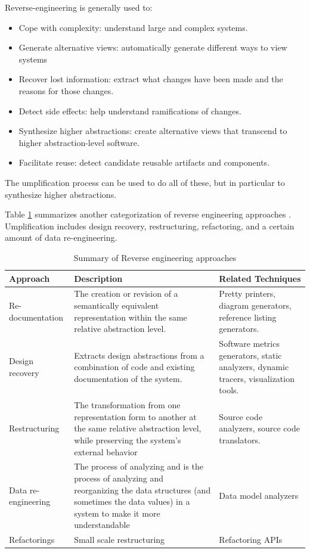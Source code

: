 Reverse-engineering is generally used to:
\begin{itemize}
\item Cope with complexity: understand large and complex systems.
\item Generate alternative views: automatically generate different ways to view systems
\item Recover lost information: extract what changes have been made and the reasons for those changes.
\item Detect side effects: help understand ramifications of changes.
\item Synthesize higher abstractions:  create alternative views that transcend to higher abstraction-level software.
\item Facilitate reuse: detect candidate reusable artifacts and components.
\end{itemize}

The umplification process can be used to do all of these, but in particular to synthesize higher abstractions.

Table \ref{table:approachesRE} summarizes another categorization  of reverse engineering approaches \cite{Chikofsky}. Umplification includes design recovery, restructuring, refactoring, and a certain amount of data re-engineering.

\begin{table}[h]
\centering
\caption{Summary of Reverse engineering approaches \cite{Chikofsky}}
\label{table:approachesRE}
\begin{tabular}{l|p{6cm}|p{4cm}}
\toprule
\rowcolor[HTML]{BBDAFF}
\textbf{Approach} & \textbf{Description}  & \textbf{Related Techniques}  \\ \midrule
Re-documentation 
&  The creation or revision of a semantically equivalent representation within the same relative abstraction level. 
& Pretty printers, diagram generators, reference listing generators.\\ \hline

Design recovery & Extracts design abstractions from a combination of code and existing documentation of the system. & Software metrics generators, static analyzers, dynamic tracers, visualization tools. \\ \hline

Restructuring & The transformation from one representation form to another at the same relative  abstraction level, while preserving the system's external behavior & Source code analyzers, source code translators.   \\ \hline

Data re-engineering & The process of analyzing and is the process of analyzing and
reorganizing the data structures (and sometimes the data values) in a system to make it more understandable & Data model analyzers  \\ \hline
Refactorings & Small scale restructuring & Refactoring APIs \\ 
\bottomrule 
\end{tabular}
\end{table}

